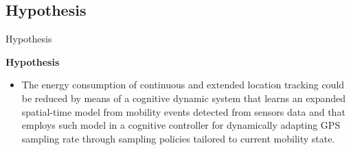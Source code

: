 \subsection{Hypothesis}
\begin{frame}{Hypothesis}
\small
\begin{block}{\small \textbf{Hypothesis}}
\renewcommand{\baselinestretch}{1.4}
\begin{itemize}
  \item The energy consumption of continuous and extended location tracking could be reduced by means of a cognitive dynamic system that learns an expanded spatial-time model from mobility events detected from sensors data and that employs such model in a cognitive controller for dynamically adapting GPS sampling rate through sampling policies tailored to current mobility state.
\end{itemize}
\end{block}
\end{frame}